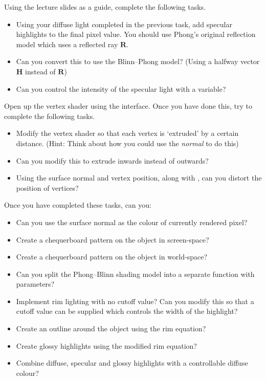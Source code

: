 \documentclass{lincolncslab}
\begin{document}
	Using the lecture slides as a guide, complete the following tasks.
	
	\begin{itemize}
		\item Using your diffuse light completed in the previous task, add specular highlights to the final pixel value. You should use Phong's original reflection model which uses a reflected ray $\mathbf{R}$.
		\item Can you convert this to use the Blinn--Phong model? (Using a halfway vector $\mathbf{H}$ instead of $\mathbf{R}$)
		\item Can you control the intensity of the specular light with a variable?
	\end{itemize}
	
	Open up the vertex shader using the interface. Once you have done this, try to complete the following tasks.
	
	\begin{itemize}
		\item Modify the vertex shader so that each vertex is `extruded' by a certain distance. (Hint: Think about how you could use the \emph{normal} to do this)
		\item Can you modify this to extrude inwards instead of outwards?
		\item Using the surface normal and vertex position, along with , can you distort the position of vertices?
	\end{itemize}
	
	Once you have completed these tasks, can you:
	
	\begin{itemize}
		\item Can you use the surface normal as the colour of currently rendered pixel? 
		\item Create a chequerboard pattern on the object in screen-space?
		\item Create a chequerboard pattern on the object in world-space?
		\item Can you split the Phong--Blinn shading model into a separate function with parameters?
		\item Implement rim lighting with no cutoff value? Can you modify this so that a cutoff value can be supplied which controls the width of the highlight?
		\item Create an outline around the object using the rim equation?
		\item Create glossy highlights using the modified rim equation?
		\item Combine diffuse, specular and glossy highlights with a controllable diffuse colour?
	\end{itemize}
	
	
	
\end{document}
